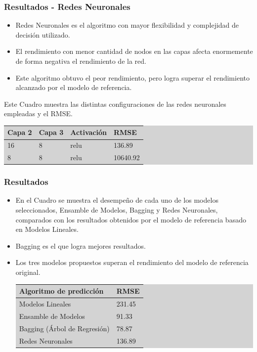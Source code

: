 \documentclass{beamer}
\begin{document}
\begin{frame}[t]
\frametitle{Resultados - Redes Neuronales}
\vfill
\begin{itemize}
\item
Redes Neuronales es el algoritmo con mayor flexibilidad y complejidad de decisión utilizado.
\item
El rendimiento con menor cantidad de nodos en las capas afecta enormemente de forma negativa el rendimiento de la red.
\item
Este algoritmo obtuvo el peor rendimiento, pero logra superar el rendimiento alcanzado por el modelo de referencia.
\end{itemize}

Este Cuadro muestra las distintas configuraciones de las redes neuronales empleadas y el RMSE.

\begin{table}[!hbt]
\centering
\begingroup\setlength{\fboxsep}{0pt}
\colorbox{lightgray}{%
\begin{tabular}{|l|l|l|l|}
\hline Capa 2 &  Capa 3  &  Activación & RMSE \\
\hline 16 & 8  &  relu &136.89\\
\hline 8 & 8  &  relu &10640.92\\
\hline
\end{tabular}%
}\endgroup
\end{table}
\vfill
\end{frame}
\begin{frame}[t]
\frametitle{Resultados}
\vfill
\begin{itemize}
\item
En el Cuadro se muestra el desempeño de cada uno de los modelos seleccionados, Ensamble de Modelos, Bagging y Redes Neuronales, comparados con los resultados obtenidos por el modelo de referencia basado en Modelos Lineales. 
\item
Bagging es el que logra mejores resultados. 
\item
Los tres modelos propuestos superan el rendimiento del modelo de referencia original.

\begin{table}[!hbt]
\centering
\begingroup\setlength{\fboxsep}{0pt}
\colorbox{lightgray}{%
\begin{tabular}{|l|l|}
\hline Algoritmo de predicción & RMSE \\
\hline Modelos Lineales & 231.45\\
\hline Ensamble de Modelos & 91.33\\
\hline Bagging (Árbol de Regresión)& 78.87\\
\hline Redes Neuronales & 136.89 \\
\hline
\end{tabular}%
}\endgroup
\end{table}
\vfill
\end{itemize}
\end{frame}
\end{document}
